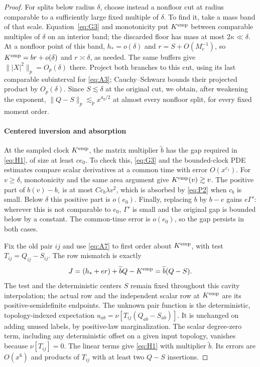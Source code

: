 \begin{proof}
For splits below radius \(\delta\), choose instead a nonfloor cut
at radius comparable to a sufficiently large fixed multiple of
\(\delta\). To find it, take a mass band of that scale.
Equation~\eqref{eq:G3} and monotonicity put \(K^{\rm emp}\)
between comparable multiples of \(\delta\) on an interior band;
the discarded floor has mass at most \(2\kappa\ll\delta\).
At a nonfloor point of this band, \(h_*=o(\delta)\) and
\(r=S+O(M_c^{-1})\), so
\(K^{\rm emp}=br+o(\delta)\) and \(r\asymp\delta\), as needed.
The same buffers give \(\||X|^2\|_p=O_p(\delta)\) there.
Project both branches to this cut, using its last comparable
subinterval for \eqref{eq:A3}; Cauchy--Schwarz bounds their projected
product by \(O_p(\delta)\). Since \(S\lesssim\delta\) at the
original cut, we obtain, after weakening the exponent,
\(\|Q-S\|_p\lesssim_p x^{a_g/2}\) at almost every nonfloor split,
for every fixed moment order.

\paragraph{Centered inversion and absorption}
At the sampled clock \(K^{\rm emp}\), the matrix multiplier
\(\widetilde b\) has the gap required in \eqref{eq:H1}, of size
at least \(ce_0\). To check this, \eqref{eq:G3} and the bounded-clock
PDE estimates compare scalar derivatives at a common time with error
\(O(x^{c_1})\).
For \(v\ge\delta\), monotonicity and the same area argument give
\(K^{\rm emp}(v)\gtrsim v\). The positive part of
\(b(v)-b_\circ\) is at most \(Cc_b\lambda v^2\), which is
absorbed by \eqref{eq:P2} when \(c_b\) is small. Below \(\delta\)
this positive part is \(o(e_0)\). Finally, replacing \(b\) by
\(b-e\) gains \(e\Gamma'\): wherever this is not comparable to
\(e_0\), \(\Gamma'\) is small and the original gap is bounded
below by a constant. The common-time error is \(o(e_0)\), so the
gap persists in both cases.

Fix the old pair \(ij\) and use \eqref{eq:A7} to first order about
\(K^{\rm emp}\), with test \(T_{ij}=Q_{ij}-S_{ij}\).
The row mismatch is exactly
\[
 J=(h_*+er)+\widetilde b Q-K^{\rm emp}
   =\widetilde b(Q-S).
\]
The test and the deterministic centers \(S\) remain fixed throughout
this cavity interpolation; the actual row and the independent scalar
row at \(K^{\rm emp}\) are its positive-semidefinite endpoints.
The unknown pair function is the deterministic, topology-indexed
expectation
\(u_{ab}=\nu[T_{ij}(Q_{ab}-S_{ab})]\).
It is unchanged on adding unused labels, by positive-law
marginalization. The scalar degree-zero term, including any
deterministic offset on a given input topology, vanishes because
\(\nu[T_{ij}]=0\). The linear terms give \eqref{eq:H1} with
multiplier \(\widetilde b\). Its errors are \(O(x^6)\) and
products of \(T_{ij}\) with at least two \(Q-S\) insertions.


\end{proof}
